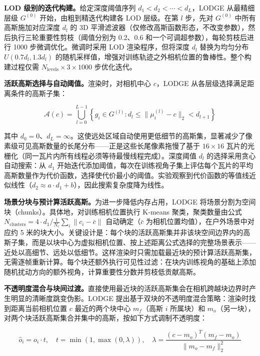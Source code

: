 \textbf{LOD 级别的迭代构建。}给定深度阈值序列 $d_1 < d_2 < \cdots < d_L$，LODGE 从最精细层级 $G^{(0)}$ 开始，由粗到精迭代构建各 LOD 层级。在第 $l$ 步，先对 $G^{(0)}$ 中所有高斯施加对应深度 $d_l$ 的 3D 平滑滤波器（仅修改高斯函数形态，不改变参数），然后执行三轮重要性剪枝（阈值分别为 0.2、0.6 和一个可调超参数），每轮剪枝后进行 1000 步微调优化。微调时采用 LOD 渲染程序，但将深度 $d_l$ 替换为均匀分布 $U(0.7d_l, 1.3d_l)$ 的随机采样值，增强对训练轨迹之外相机位置的鲁棒性。整个构建过程仅需 $N_{\text{levels}} \times 3 \times 1000$ 步优化迭代。

\textbf{活跃高斯选择与自动阈值。}渲染时，对相机中心 $c$，LODGE 从各层级选择满足距离条件的高斯子集：

\begin{equation}
\mathcal{A}(c) = \bigcup_{l=0}^{L-1}\left\{g_i \in G^{(l)} : d_l \leq \|\mu_i^{(l)} - c\|_2 < d_{l+1}\right\}
\end{equation}

其中 $d_0 = 0$、$d_L = \infty$。这使远处区域自动使用更低细节的高斯集，显著减少了像素级可见高斯数量的长尾分布——正是这些长尾像素拖慢了基于 $16 \times 16$ 瓦片的光栅化（同一瓦片内所有线程必须等待最慢线程完成）。深度阈值 $d_l$ 的选择采用贪心自动搜索：从 $d_1$ 开始迭代添加阈值，每次在训练视角子集上评估每个瓦片的平均高斯数量作为代价函数，选择使代价最小的阈值。实验观察到代价函数的等值线近似线性（$d_2 \approx a \cdot d_1 + b$），因此搜索复杂度降为线性。

\textbf{场景分块与预计算活跃高斯。}为进一步降低内存占用，LODGE 将场景分割为空间块（chunks）。具体地，对训练相机位置执行 K-means 聚类，聚类数量由公式 $N_{\text{clusters}} = 4 \cdot d_1 / \frac{1}{N_c}\sum_i\|c_i - \bar{c}\|$ 自动确定（$\bar{c}$ 为相机位置均值），在户外场景中对应约 5 米的块大小。关键设计是：每个块的活跃高斯集并非该块空间边界内的高斯子集，而是以块中心为虚拟相机位置、按上述距离公式选择的完整场景表示——近处以高细节、远处以低细节。这样渲染时只需加载最近块的预计算活跃高斯集，无需逐帧重新计算。每个块还额外执行可见性过滤：在块内训练视角的基础上添加随机扰动方向的额外视角，计算重要性分数并剪枝低贡献高斯。

\textbf{不透明度混合与块间过渡。}直接使用最近块的活跃高斯集会在相机跨越块边界时产生明显的清晰度跳变伪影。LODGE 提出基于双块的不透明度混合策略：渲染时找到距离当前相机位置 $c$ 最近的两个块中心 $m_f$（高斯 $i$ 所属块）和 $m_o$（另一块），对两个块活跃高斯集合并集中的高斯，按如下方式调制不透明度：

\begin{equation}
\hat{o}_i = o_i \cdot t, \quad t = \min\left(1, \max(0, \lambda)\right), \quad \lambda = \frac{(c - m_o)^T(m_f - m_o)}{\|m_o - m_f\|_2^2}
\end{equation}


